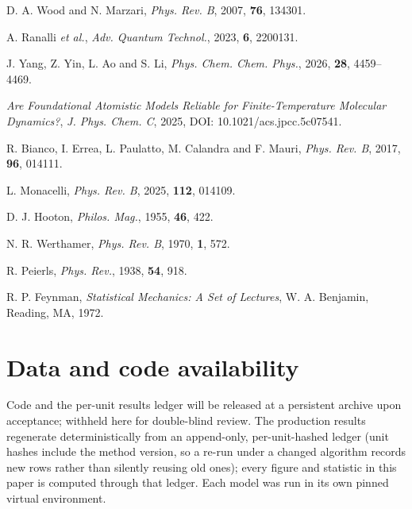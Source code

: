 \documentclass{article}
\begin{document}
\begin{enumerate}[leftmargin=*,itemsep=0pt,topsep=2pt,label={[\arabic*]}]
\item D. A. Wood and N. Marzari, \textit{Phys. Rev. B}, 2007, \textbf{76}, 134301.
\item A. Ranalli \textit{et al.}, \textit{Adv. Quantum Technol.}, 2023, \textbf{6}, 2200131.
\item J. Yang, Z. Yin, L. Ao and S. Li, \textit{Phys. Chem. Chem. Phys.}, 2026, \textbf{28}, 4459--4469.
\item \textit{Are Foundational Atomistic Models Reliable for Finite-Temperature Molecular Dynamics?}, \textit{J. Phys. Chem. C}, 2025, DOI: 10.1021/acs.jpcc.5c07541.
\item R. Bianco, I. Errea, L. Paulatto, M. Calandra and F. Mauri, \textit{Phys. Rev. B}, 2017, \textbf{96}, 014111.
\item L. Monacelli, \textit{Phys. Rev. B}, 2025, \textbf{112}, 014109.
\item D. J. Hooton, \textit{Philos. Mag.}, 1955, \textbf{46}, 422.
\item N. R. Werthamer, \textit{Phys. Rev. B}, 1970, \textbf{1}, 572.
\item R. Peierls, \textit{Phys. Rev.}, 1938, \textbf{54}, 918.
\item R. P. Feynman, \textit{Statistical Mechanics: A Set of Lectures}, W. A. Benjamin, Reading, MA, 1972.
\end{enumerate}
\normalsize

\appendix

\section{Data and code availability}
\label{app:data}
Code and the per-unit results ledger will be released at a persistent archive upon acceptance; withheld here for double-blind review. The production results regenerate deterministically from an append-only, per-unit-hashed ledger (unit hashes include the method version, so a re-run under a changed algorithm records new rows rather than silently reusing old ones); every figure and statistic in this paper is computed through that ledger. Each model was run in its own pinned virtual environment.
\end{document}
